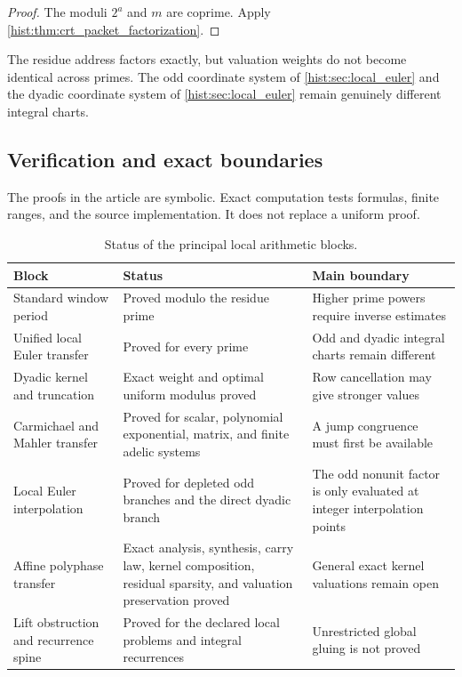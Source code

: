 \begin{proof}
The moduli \(2^a\) and \(m\) are coprime. Apply \cref{hist:thm:crt_packet_factorization}.
\end{proof}

\begin{histremark}\label{hist:rem:crt_weight_boundary}
The residue address factors exactly, but valuation weights do not become identical across primes. The odd coordinate system of \cref{hist:sec:local_euler} and the dyadic coordinate system of \cref{hist:sec:local_euler} remain genuinely different integral charts.
\end{histremark}

\subsection{Verification and exact boundaries}\label{hist:sec:boundaries}

The proofs in the article are symbolic. Exact computation tests formulas, finite ranges, and the source implementation. It does not replace a uniform proof.

\begin{table}[t]
\centering
\caption{Status of the principal local arithmetic blocks.}
\label{hist:tab:status}
\begin{tabular}{>{\raggedright\arraybackslash}p{}>{\raggedright\arraybackslash}p{}>{\raggedright\arraybackslash}p{}}
\toprule
Block & Status & Main boundary\\
\midrule
Standard window period & Proved modulo the residue prime & Higher prime powers require inverse estimates\\
Unified local Euler transfer & Proved for every prime & Odd and dyadic integral charts remain different\\
Dyadic kernel and truncation & Exact weight and optimal uniform modulus proved & Row cancellation may give stronger values\\
Carmichael and Mahler transfer & Proved for scalar, polynomial exponential, matrix, and finite adelic systems & A jump congruence must first be available\\
Local Euler interpolation & Proved for depleted odd branches and the direct dyadic branch & The odd nonunit factor is only evaluated at integer interpolation points\\
Affine polyphase transfer & Exact analysis, synthesis, carry law, kernel composition, residual sparsity, and valuation preservation proved & General exact kernel valuations remain open\\
Lift obstruction and recurrence spine & Proved for the declared local problems and integral recurrences & Unrestricted global gluing is not proved\\
\bottomrule
\end{tabular}
\end{table}

